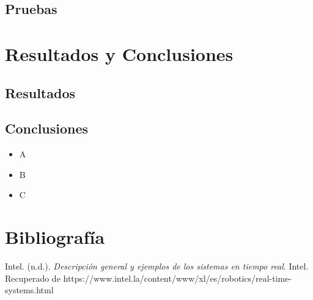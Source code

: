 \documentclass[12pt,letterpaper,spanish, xcolor=table]{report}
\begin{document}
\section{Pruebas}


	
	
\chapter{Resultados y Conclusiones}
\newpage
	
\section{Resultados}

\section{Conclusiones}


	

\newpage
\appendix
	
%

	
	
\begin{itemize}
	\item A
	\item B
	\item C
\end{itemize}



\newpage
\chapter{Bibliografía}

	Intel. (n.d.). \textit{Descripción general y ejemplos de los sistemas en tiempo real}. Intel. Recuperado de {https://www.intel.la/content/www/xl/es/robotics/real-time-systems.html}\\
	
\end{document}
